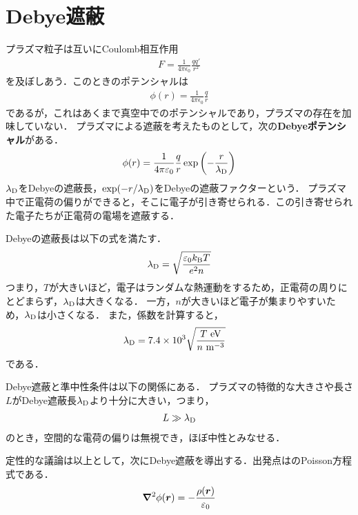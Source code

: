 \documentclass{report}
\begin{document}
  \section{Debye遮蔽}
    プラズマ粒子は互いにCoulomb相互作用
    \begin{align}
      F = \frac{1}{4\pi \epsilon_0}\frac{qq'}{r^2}
    \end{align}
    を及ぼしあう．このときのポテンシャルは
    \begin{align}
      \phi(r) = \frac{1}{4\pi \epsilon_0}\frac{q}{r}
    \end{align}
    であるが，これはあくまで真空中でのポテンシャルであり，プラズマの存在を加味していない．
    プラズマによる遮蔽を考えたものとして，次の\textbf{Debyeポテンシャル}がある．
    \begin{align}
      \phi(r) = \frac{1}{4\pi\varepsilon_0}\frac{q}{r}\exp\qty(-\frac{r}{\lambda_{\mathrm{D}}})
    \end{align}
    $\lambda_{\mathrm{D}}$をDebyeの遮蔽長，$\exp(-r/\lambda_{\mathrm{D}})$をDebyeの遮蔽ファクターという．
    プラズマ中で正電荷の偏りができると，そこに電子が引き寄せられる．この引き寄せられた電子たちが正電荷の電場を遮蔽する．
    \par
    Debyeの遮蔽長は以下の式を満たす．
    \begin{align}
      \lambda_{\mathrm{D}} = \sqrt{\frac{\varepsilon_0 k_{\mathrm{B}} T}{e^2 n}}
    \end{align}
    つまり，$T$が大きいほど，電子はランダムな熱運動をするため，正電荷の周りにとどまらず，$\lambda_{\mathrm{D}}$は大きくなる．
    一方，$n$が大きいほど電子が集まりやすいため，$\lambda_{\mathrm{D}}$は小さくなる．
    また，係数を計算すると，
    \begin{align}
      \lambda_{\r{D}} &= 7.4\times 10^3\sqrt{\frac{T\ \r{eV}}{n\ \r{m^{-3}}}}
    \end{align}
    である．
    \par
    Debye遮蔽と準中性条件は以下の関係にある．
    プラズマの特徴的な大きさや長さ$L$がDebye遮蔽長$\lambda_{\mathrm{D}}$より十分に大きい，つまり，
    \begin{align}
      L \gg \lambda_{\mathrm{D}}
    \end{align}
    のとき，空間的な電荷の偏りは無視でき，ほぼ中性とみなせる．
    \par
    定性的な議論は以上として，次にDebye遮蔽を導出する．出発点はのPoisson方程式である．
    \begin{align}
      \grad^2 \phi(\bm{r}) = -\frac{\rho(\bm{r})}{\varepsilon_0} \label{poisson-eq}
    \end{align}
\end{document}
